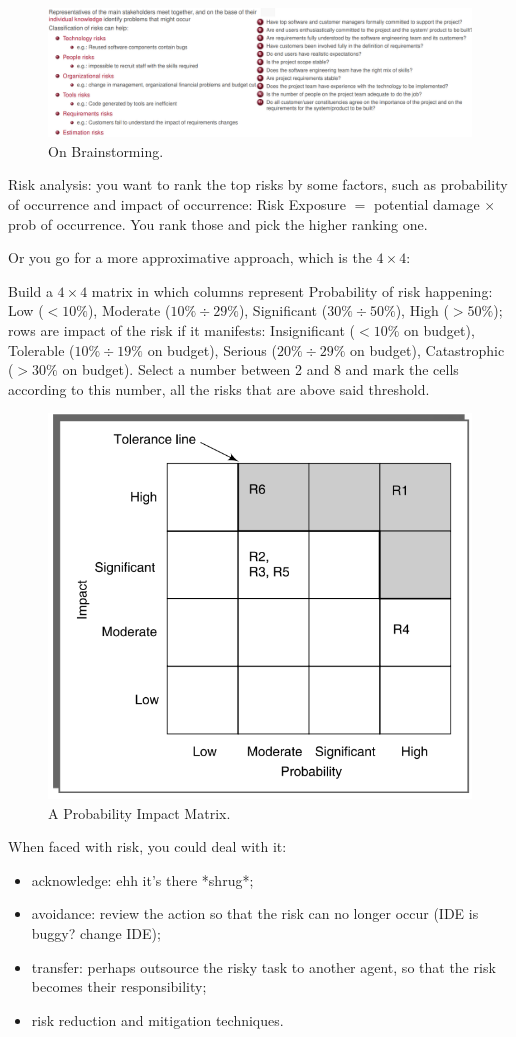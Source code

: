 \begin{figure} [H]
    \centering
    \includegraphics[width=1\linewidth]{Figures//04/bs1.png}
    \caption{On Brainstorming.}
\end{figure}

\noindent Risk analysis: you want to rank the top risks by some factors, such as probability of occurrence and impact of occurrence: Risk Exposure $=$ potential damage $\times$ prob of occurrence. You rank those and pick the higher ranking one.

\noindent Or you go for a more approximative approach, which is the $4 \times 4$:

\noindent Build a $4 \times 4$ matrix in which columns represent Probability of risk happening: Low ($<10\%$), Moderate ($10\%\div29\%$), Significant ($30\%\div50\%$), High ($>50\%$); rows are impact of the risk if it manifests: Insignificant ($<10\%$ on budget), Tolerable ($10\%\div19\%$ on budget), Serious ($20\%\div29\%$ on budget), Catastrophic ($>30\%$ on budget). Select a number between 2 and 8 and mark the cells according to this number, all the risks that are above said threshold.

\begin{figure} [H]
    \centering
    \includegraphics[width=0.5\linewidth]{Figures//04/4x4.png}
    \caption{A Probability Impact Matrix.}
\end{figure}
\newpage

\noindent When faced with risk, you could deal with it:
\begin{itemize}
    \item acknowledge: ehh it's there *shrug*;
    \item avoidance: review the action so that the risk can no longer occur (IDE is buggy? change IDE);
    \item transfer: perhaps outsource the risky task to another agent, so that the risk becomes their responsibility;
    \item risk reduction and mitigation techniques.
\end{itemize}

